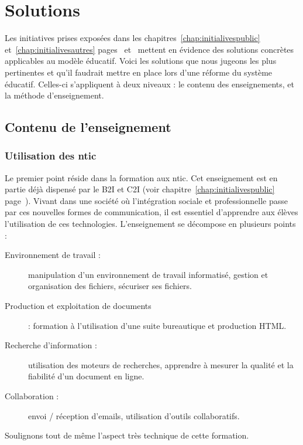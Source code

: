 \chapter{Solutions}
\label{chap:solutions}

Les initiatives prises exposées dans les chapitres~\ref{chap:initialivespublic} et~\ref{chap:initialivesautres} pages~\pageref{chap:initialivespublic} et~\pageref{chap:initialivesautres} mettent en évidence des solutions concrètes applicables au modèle éducatif. Voici les solutions que nous jugeons les plus pertinentes et qu'il faudrait mettre en place lors d'une réforme du système éducatif. Celles-ci s'appliquent à deux niveaux : le contenu des enseignements, et la méthode d'enseignement.

\section{Contenu de l'enseignement}
\subsection{Utilisation des \gls{ntic}}
Le premier point réside dans la formation aux \gls{ntic}. Cet enseignement est en partie déjà dispensé par le B2I et C2I (voir chapitre~\ref{chap:initialivespublic} page~\pageref{chap:initialivespublic}). Vivant dans une société où l'intégration sociale et professionnelle passe par ces nouvelles formes de communication, il est essentiel d'apprendre aux élèves l'utilisation de ces technologies. L'enseignement se décompose en plusieurs points :

\begin{description}
  \item[Environnement de travail :] manipulation d'un environnement de travail informatisé, gestion et organisation des fichiers, sécuriser ses fichiers.
  \item[Production et exploitation de documents] : formation à l'utilisation d'une suite bureautique et production HTML.
  \item[Recherche d'information :] utilisation des moteurs de recherches, apprendre à mesurer la qualité et la fiabilité d'un document en ligne.
  \item[Collaboration :] envoi / réception d'emails, utilisation d'outils collaboratifs.
\end{description}

Soulignons tout de même l'aspect très technique de cette formation.

